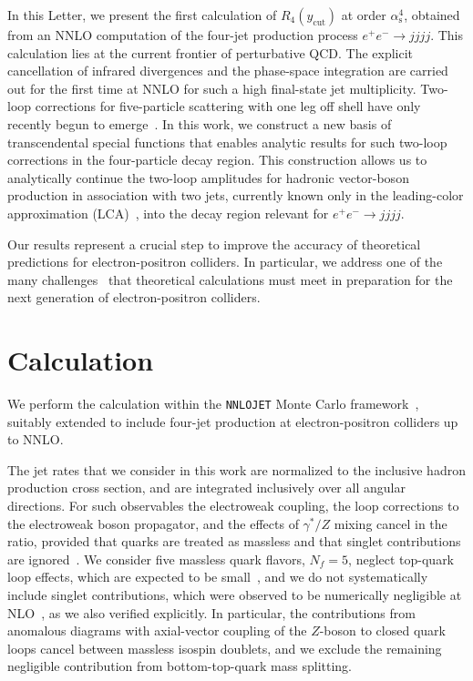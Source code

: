 \documentclass[10pt,aps,prl,superscriptaddress,twocolumn,preprintnumbers,nofootinbib]{revtex4-2}
\newcommand{\ycut}{y_{\mathrm{cut}}}
\newcommand{\alphas}{\alpha_{\mathrm{s}}}
\begin{document}
In this Letter, we present the first calculation of $R_4(\ycut)$ at order $\alphas^4$, obtained from an NNLO computation of the four-jet production process $e^+e^- \to jjjj$.
This calculation lies at the current frontier of perturbative QCD.
The explicit cancellation of infrared divergences and the phase-space integration are carried out for the first time at NNLO for such a high final-state jet multiplicity.
Two-loop corrections for five-particle scattering with one leg off shell have only recently begun to emerge~\cite{Abreu:2021asb,DeLaurentis:2025dxw,Badger:2024mir,Badger:2021nhg,Badger:2022ncb,Badger:2021ega,Abreu:2021smk,Abreu:2020jxa,Badger:2024sqv,Abreu:2023rco,Canko:2020ylt,Kardos:2022tpo,Papadopoulos:2015jft,Chicherin:2021dyp}.
In this work, we construct a new basis of transcendental special functions that enables analytic results for such two-loop corrections in the four-particle decay region.
This construction allows us to analytically continue the two-loop amplitudes for hadronic vector-boson production in association with two jets, currently known only in the leading-color approximation (LCA)~\cite{Abreu:2021asb,DeLaurentis:2025dxw}, into the decay region relevant for $e^+e^- \to jjjj$.

Our results represent a crucial step to improve the accuracy of theoretical predictions for electron-positron colliders.
In particular, we address one of the many challenges~\cite{deBlas:2025gyz} that theoretical calculations must meet in preparation for the next generation of electron-positron colliders.



\section{Calculation}

We perform the calculation within the \texttt{NNLOJET} Monte Carlo framework~\cite{NNLOJET:2025rno}, suitably extended to include four-jet production at electron-positron colliders up to NNLO.

The jet rates that we consider in this work are normalized to the inclusive hadron production cross section, and are integrated inclusively over all angular directions. For such observables the electroweak coupling, the loop corrections to the electroweak boson propagator, and the effects of $\gamma^*/Z$ mixing cancel in the ratio, provided that quarks are treated as massless and that singlet contributions are ignored~\cite{Chetyrkin:1996ela}. We consider five massless quark flavors, $N_f=5$, neglect top-quark loop effects, which are expected to be small~\cite{Dixon:1997th,Campbell:2016tcu}, and we do not  systematically include singlet contributions, which were observed to be numerically negligible at NLO~\cite{Kniehl:1989bb,Dixon:1997th, Hagiwara:1990dx, Signer:1996bf,Frederix:2010ne}, as we also verified explicitly.
In particular, the contributions from anomalous diagrams with axial-vector coupling of the $Z$-boson to closed quark loops cancel between massless isospin doublets,
and we exclude the remaining negligible contribution from bottom-top-quark mass splitting.
\end{document}
